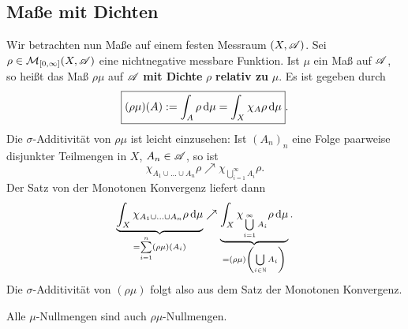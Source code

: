 \subsection{Maße mit Dichten}
Wir betrachten nun Maße auf einem festen Messraum $(X,\AA)$. Sei $\rho\in \MM_{[0,\infty]}(X,\AA)$ eine nichtnegative messbare Funktion. Ist $\mu$ ein Maß auf $\AA$, so heißt das Maß $\rho\mu$ auf $\AA$ \textbf{mit Dichte} $\rho$ \textbf{relativ zu} $\mu$. Es ist gegeben durch
\begin{equation} \label{mas-dicht-def}
\boxed{(\rho\mu)(A):= \int_A \rho \D\mu = \int_X \chi_A \rho \D\mu}.
\end{equation}
Die $\sigma$-Additivität von $\rho\mu$ ist leicht einzusehen: Ist $(A_n)_n$ eine Folge paarweise disjunkter Teilmengen in $X$, $A_n\in \AA$, so ist $$\chi_{A_1\cup...\cup A_n} \rho \nearrow \chi_{\bigcup_{i=1}^\infty A_i} \rho.$$ Der Satz von der Monotonen Konvergenz liefert dann 
$$\underbrace{\int_X \chi_{A_1\cup...\cup A_n} \rho \D \mu}_{\overset{\te{}}{=}\sum\limits_{i=1}^n(\rho\mu)(A_i)} \nearrow \underbrace{\int_X \chi_{\bigcup\limits_{i=1}^\infty A_i} \rho  \D\mu}_{=(\rho\mu)\left( \bigcup\limits_{i\in\N} A_i \right)}.$$
Die $\sigma$-Additivität von $(\rho\mu)$ folgt also aus dem Satz der Monotonen Konvergenz.

\begin{beobachtung}
Alle $\mu$-Nullmengen sind auch $\rho\mu$-Nullmengen.
\end{beobachtung}

